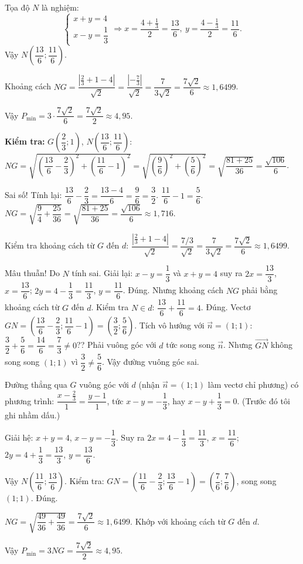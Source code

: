 \begin{bt}
{Tọa độ $N$ là nghiệm:
$$\begin{cases}x+y=4\\ x-y=\dfrac{1}{3}\end{cases}\Rightarrow x=\dfrac{4+\frac13}{2}=\dfrac{13}{6},\ y=\dfrac{4-\frac13}{2}=\dfrac{11}{6}.$$
Vậy $N\left(\dfrac{13}{6};\dfrac{11}{6}\right)$.

Khoảng cách $NG=\dfrac{\left|\frac23+1-4\right|}{\sqrt{2}}=\dfrac{\left|-\frac73\right|}{\sqrt{2}}=\dfrac{7}{3\sqrt{2}}=\dfrac{7\sqrt{2}}{6}\approx1{,}6499$.

Vậy $P_{\min}=3\cdot\dfrac{7\sqrt2}{6}=\dfrac{7\sqrt2}{2}\approx4{,}95$.

\textbf{Kiểm tra:} $G\left(\dfrac23;1\right)$, $N\left(\dfrac{13}{6};\dfrac{11}{6}\right)$: $NG=\sqrt{\left(\dfrac{13}{6}-\dfrac23\right)^2+\left(\dfrac{11}{6}-1\right)^2}=\sqrt{\left(\dfrac{9}{6}\right)^2+\left(\dfrac56\right)^2}=\sqrt{\dfrac{81+25}{36}}=\dfrac{\sqrt{106}}{6}$.

Sai số! Tính lại: $\dfrac{13}{6}-\dfrac{2}{3}=\dfrac{13-4}{6}=\dfrac{9}{6}=\dfrac32$. $\dfrac{11}{6}-1=\dfrac56$. $NG=\sqrt{\dfrac94+\dfrac{25}{36}}=\sqrt{\dfrac{81+25}{36}}=\dfrac{\sqrt{106}}{6}\approx1{,}716$.

Kiểm tra khoảng cách từ $G$ đến $d$: $\dfrac{\left|\frac23+1-4\right|}{\sqrt2}=\dfrac{7/3}{\sqrt2}=\dfrac{7}{3\sqrt2}=\dfrac{7\sqrt2}{6}\approx1{,}6499$. 

Mâu thuẫn! Do $N$ tính sai. Giải lại: $x-y=\dfrac13$ và $x+y=4$ suy ra $2x=\dfrac{13}{3}$, $x=\dfrac{13}{6}$; $2y=4-\dfrac13=\dfrac{11}{3}$, $y=\dfrac{11}{6}$. Đúng. Nhưng khoảng cách $NG$ phải bằng khoảng cách từ $G$ đến $d$. Kiểm tra $N\in d$: $\dfrac{13}{6}+\dfrac{11}{6}=4$. Đúng. Vectơ $GN=\left(\dfrac{13}{6}-\dfrac23;\dfrac{11}{6}-1\right)=\left(\dfrac32;\dfrac56\right)$. Tích vô hướng với $\overrightarrow{n}=(1;1)$: $\dfrac32+\dfrac56=\dfrac{14}{6}=\dfrac73\neq0$?? Phải vuông góc với $d$ tức song song $\overrightarrow n$. Nhưng $\overrightarrow{GN}$ không song song $(1;1)$ vì $\dfrac32\neq\dfrac56$. Vậy đường vuông góc sai.

Đường thẳng qua $G$ vuông góc với $d$ (nhận $\overrightarrow{n}=(1;1)$ làm vectơ chỉ phương) có phương trình: $\dfrac{x-\frac23}{1}=\dfrac{y-1}{1}$, tức $x-y=-\dfrac13$, hay $x-y+\dfrac13=0$. (Trước đó tôi ghi nhầm dấu.)

Giải hệ: $x+y=4$, $x-y=-\dfrac13$. Suy ra $2x=4-\dfrac13=\dfrac{11}{3}$, $x=\dfrac{11}{6}$; $2y=4+\dfrac13=\dfrac{13}{3}$, $y=\dfrac{13}{6}$.

Vậy $N\left(\dfrac{11}{6};\dfrac{13}{6}\right)$. Kiểm tra: $GN=\left(\dfrac{11}{6}-\dfrac23;\dfrac{13}{6}-1\right)=\left(\dfrac76;\dfrac76\right)$, song song $(1;1)$. Đúng.

$NG=\sqrt{\dfrac{49}{36}+\dfrac{49}{36}}=\dfrac{7\sqrt2}{6}\approx1{,}6499$. Khớp với khoảng cách từ $G$ đến $d$.

Vậy $P_{\min}=3NG=\dfrac{7\sqrt2}{2}\approx4{,}95$.
}

\end{bt}

